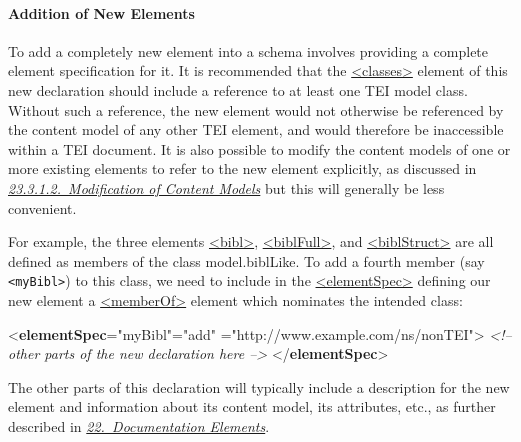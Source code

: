 \paragraph[{Addition of New Elements}]{Addition of New Elements}\label{MDMDNE}\par
To add a completely new element into a schema involves providing a complete element specification for it. It is recommended that the \hyperref[TEI.classes]{<classes>} element of this new declaration should include a reference to at least one TEI model class. Without such a reference, the new element would not otherwise be referenced by the content model of any other TEI element, and would therefore be inaccessible within a TEI document. It is also possible to modify the content models of one or more existing elements to refer to the new element explicitly, as discussed in \textit{\hyperref[MDMDCM]{23.3.1.2.\ Modification of Content Models}}  but this will generally be less convenient.\par
For example, the three elements \hyperref[TEI.bibl]{<bibl>}, \hyperref[TEI.biblFull]{<biblFull>}, and \hyperref[TEI.biblStruct]{<biblStruct>} are all defined as members of the class \textsf{model.biblLike}. To add a fourth member (say \texttt{<myBibl>}) to this class, we need to include in the \hyperref[TEI.elementSpec]{<elementSpec>} defining our new element a \hyperref[TEI.memberOf]{<memberOf>} element which nominates the intended class: \par\bgroup{}\exampleFont \begin{shaded}\noindent\mbox{}{<\textbf{elementSpec}\hspace*{1em}{ident}="{myBibl}"\hspace*{1em}{mode}="{add}"\mbox{}\newline 
\hspace*{1em}{ns}="{http://www.example.com/ns/nonTEI}">}\mbox{}\newline 
{}\mbox{}\newline 
\hspace*{1em}\mbox{}\newline 
{}\mbox{}\newline 
\textit{<!-- other parts of the new declaration here -->}\mbox{}\newline 
{</\textbf{elementSpec}>}\end{shaded}\egroup\par \noindent  The other parts of this declaration will typically include a description for the new element and information about its content model, its attributes, etc., as further described in \textit{\hyperref[TD]{22.\ Documentation Elements}}.
